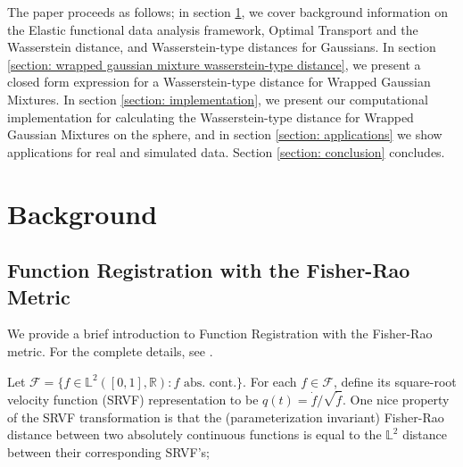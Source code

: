\documentclass[]{article}
\begin{document}
The paper proceeds as follows; in section \ref{section: theory}, we cover background information on the Elastic functional data analysis framework, Optimal Transport and the Wasserstein distance, and Wasserstein-type distances for Gaussians. In section \ref{section: wrapped gaussian mixture wasserstein-type distance}, we present a closed form expression for a Wasserstein-type distance for Wrapped Gaussian Mixtures. In section \ref{section: implementation}, we present our computational implementation for calculating the Wasserstein-type distance for Wrapped Gaussian Mixtures on the sphere, and in section \ref{section: applications} we show applications for real and simulated data. Section \ref{section: conclusion} concludes.  

\section{Background}\label{section: theory}

%
%

\subsection{Function Registration with the Fisher-Rao Metric}

We provide a brief introduction to Function Registration with the Fisher-Rao metric. For the complete details, see \cite{https://doi.org/10.48550/arxiv.1103.3817}.

Let $\mathcal{F} = \{ f \in \mathbb{L}^2([0,1], \mathbb{R}): f \text{ abs. cont.}\}$. For each $f \in \mathcal{F}$, define its square-root velocity function (SRVF) representation to be $q(t) = \dot{f}/\sqrt{\dot{f}}$. %
One nice property of the SRVF transformation is that the (parameterization invariant) Fisher-Rao distance between two absolutely continuous functions is equal to the $\mathbb{L}^2$ distance between their corresponding SRVF's;
\end{document}
